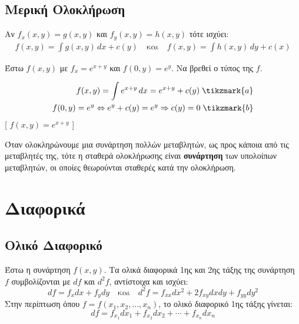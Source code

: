 \documentclass[a4paper,table]{report}
\begin{document}
\section{Μερική Ολοκλήρωση}

\begin{rem}
\item {}
  Αν $ f_{x}(x,y) = g(x,y)$ και $ f_{y}(x,y)=h(x,y) $ τότε ισχύει:
  \begin{align*}
    f(x,y) = \int g(x,y) \,{dx} + c(y) \quad \text{και} \quad f(x,y) = 
    \int h(x,y) \,{dy} + c(x) 
  \end{align*} 
\end{rem}

\begin{example}
  Έστω $ f(x,y)$ με $ f_{x}=e^{x+y} $ και $ f(0,y)=e^{y} $. Να βρεθεί ο τύπος της $f$.
\end{example}
\begin{solution}
  \begin{align*}
    f(x,y) = \int e^{x+y} \,{dx} = e^{x+y} + c(y) \; \tikzmark{a} \\ 
    f(0,y) = e^{y} \Leftrightarrow e^{y}+ c(y) = e^{y} \Rightarrow c(y) = 0 
    \; \tikzmark{b}
  \end{align*}
  [ $f(x,y) = e^{x+y}$ ]
\end{solution}

\begin{rem}
  Όταν ολοκληρώνουμε μια συνάρτηση πολλών μεταβλητών, ως προς κάποια από τις 
  μεταβλητές της, τότε η σταθερά ολοκλήρωσης είναι \textbf{συνάρτηση} των υπολοίπων 
  μεταβλητών, οι οποίες θεωρούνται σταθερές κατά την ολοκλήρωση.
\end{rem}



\chapter{Διαφορικά}

\section{Ολικό Διαφορικό}

\begin{dfn}
  Έστω η συνάρτηση $ f(x,y) $. Τα \textcolor{Col1}{ολικά διαφορικά} 1ης και 
  2ης τάξης της συνάρτηση $f$ συμβολίζονται με $ df $ και $ d^{2}f $, αντίστοιχα 
  και ισχύει:
  \[
    \boxed{df = f_{x}dx + f_{y}dy} \quad \text{και} \quad 
    \boxed{d^{2}f = f_{xx}dx^{2}+2f_{xy}dxdy+f_{yy}dy^{2}}
  \] 
  Στην περίπτωση όπου $ f= f(x_{1}, x_{2}, \ldots, x_{n}) $, το ολικό 
  διαφορικό 1ης τάξης γίνεται: 
  \[
    df = f_{x_{1}}d{x_{1}} + f_{x_{2}}d{x_{2}} + \cdots + f_{x_{n}} dx_{n}
  \]
\end{dfn}
\end{document}

